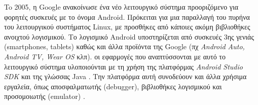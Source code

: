 To 2005, η Google ανακοίνωσε ένα νέο λειτουργικό σύστημα προοριζόμενο για φορητές συσκευές με το όνομα Android. Πρόκειται για μια παραλλαγή του πυρήνα του λειτουργικού συστήματος Linux, με προσθήκες από κάποιες ακόμη βιβλιοθήκες ανοιχτού λογισμικού. Το λογισμικό Android υποστηρίζεται από συσκευές 3ης γενιάς (smartphones, tablets) καθώς και άλλα προϊόντα της Google (πχ \textit{Android Auto, Android TV, Wear OS} κλπ). οι εφαρμογές που αναπτύσσονται με αυτό το λειτουργικό σύστημα υλοποιούνται με τη χρήση της πλατφόρμας \textit{Android Studio SDK} \cite{[JAVA9]} και της γλώσσας Java \cite{[JAVA10]}. Την πλατφόρμα αυτή συνοδεύουν και άλλα χρήσιμα εργαλεία, όπως αποσφαλματωτής (debugger), βιβλιοθήκες λογισμικού και προσομοιωτής (emulator) \cite{[JAVA11]}.

